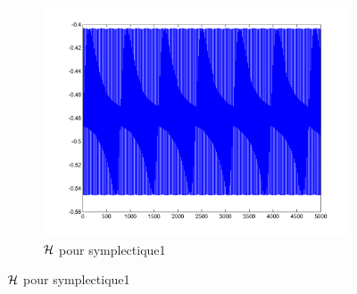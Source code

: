 \begin{figure}[!ht]
\begin{subfigure}[b]{0.3\textwidth}
    \includegraphics[width=\textwidth]{images/Q1_symplectique1_H.png}
    \caption{$\mathcal{H}$ pour symplectique1}
    \label{fig:q1_symplectique1_H}
  \end{subfigure}


\end{figure}
